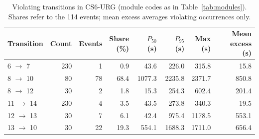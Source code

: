 \begin{table}[tbp]
\caption{Violating transitions in CS6-URG (module codes as in Table~\ref{tab:modules}). Shares refer to the 114 events; mean excess averages violating occurrences only.\label{tab:wait-stages}}
\centering
\footnotesize
\setlength{\tabcolsep}{3pt}
\begin{tabular*}{\textwidth}{@{\extracolsep{\fill}}lrrrrrrr@{}}
\toprule
Transition & Count & Events & \shortstack{Share\\(\%)} & \shortstack{$P_{50}$\\(s)} & \shortstack{$P_{95}$\\(s)} & \shortstack{Max\\(s)} & \shortstack{Mean excess\\(s)}\\
\midrule
6 $\to$ 7 & 230 & 1 & 0.9 & 43.6 & 226.0 & 315.8 & 15.8\\
8 $\to$ 10 & 80 & 78 & 68.4 & 1077.3 & 2235.8 & 2371.7 & 850.8\\
8 $\to$ 12 & 30 & 2 & 1.8 & 15.3 & 254.3 & 602.4 & 201.4\\
11 $\to$ 14 & 230 & 4 & 3.5 & 43.5 & 273.8 & 340.3 & 19.5\\
12 $\to$ 13 & 30 & 7 & 6.1 & 42.4 & 975.4 & 1178.5 & 553.1\\
13 $\to$ 10 & 30 & 22 & 19.3 & 554.1 & 1688.3 & 1711.0 & 656.4\\
\bottomrule
\end{tabular*}
\end{table}
